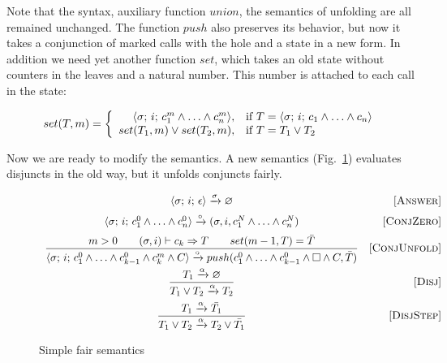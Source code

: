 Note that the syntax, auxiliary function $union$, the semantics of unfolding are all remained unchanged. The function $push$ also preserves its behavior, but now it takes a conjunction of marked
calls with the hole and a state in a new form. In addition we need yet another function $set$, which takes an old state without counters in the leaves and a natural number. This number is
attached to each call in the state:

\[
set(T, m) =
\left\{
\begin{array}{rl}
\langle \sigma;\, i;\, c_1^m \land \ldots \land c_n^m \rangle, & \mbox{if } T = \langle \sigma;\, i;\, c_1 \land \ldots \land c_n \rangle \\
set(T_1, m) \lor set(T_2, m), & \mbox{if } T = T_1 \lor T_2
\end{array}
\right.
\]

Now we are ready to modify the semantics. A new semantics (Fig.~\ref{fair:naive-semantics}) evaluates disjuncts in the old way,
but it unfolds conjuncts fairly.

\begin{figure}[h!]
\[\begin{array}{cr}

      {\langle \sigma;\, i;\, \epsilon \rangle \xrightarrow{\sigma} \varnothing}  
&     \mbox{[\textsc{Answer}]} \\[2mm]
      {\langle \sigma;\, i;\, c_1^0 \land \ldots \land c_n^0 \rangle \xrightarrow{\circ} (\sigma, i, c_1^N \land \ldots \land c_n^N)}
&     \mbox{[\textsc{ConjZero}]} \\[2mm]
\dfrac{m > 0 \qquad (\sigma, i) \vdash c_k \Rightarrow T \qquad set(m - 1, T) = \bar{T}}
      {\langle \sigma;\, i;\, c_1^0 \land \ldots \land c_{k-1}^0 \land c_k^m \land C \rangle \xrightarrow{\circ} push(c_1^0 \land \ldots \land c_{k-1}^0 \land \Box \land C, \bar{T})}
&     \mbox{[\textsc{ConjUnfold}]} \\[4mm]
\dfrac{T_1 \xrightarrow{\alpha} \varnothing}
      {T_1 \lor T_2 \xrightarrow{\alpha} T_2}
&     \mbox{[\textsc{Disj}]} \\[4mm]
\dfrac{T_1 \xrightarrow{\alpha} \bar{T_1}}
      {T_1 \lor T_2 \xrightarrow{\alpha} T_2 \lor\bar{T_1}}
&     \mbox{[\textsc{DisjStep}]}
\end{array}\]
\caption{Simple fair semantics}
\label{fair:naive-semantics}
\end{figure}

